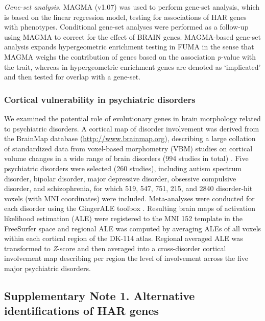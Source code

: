 \begin{refsection}
\noindent
\textit{Gene-set analysis.} MAGMA (v1.07) \citep{de2015magma} was used to perform gene-set analysis, which is based on the linear regression model, testing for associations of HAR genes with phenotypes. Conditional gene-set analyses were performed as a follow-up using MAGMA to correct for the effect of BRAIN genes. MAGMA-based gene-set analysis expands hypergeometric enrichment testing in FUMA \citep{watanabe2017functional} in the sense that MAGMA weighs the contribution of genes based on the association \textit{p}-value with the trait, whereas in hypergeometric enrichment genes are denoted as ‘implicated’ and then tested for overlap with a gene-set. 

\subsubsection*{Cortical vulnerability in psychiatric disorders}
We examined the potential role of evolutionary genes in brain morphology related to psychiatric disorders. A cortical map of disorder involvement was derived from the BrainMap database (\url{http://www.brainmap.org}), describing a large collation of standardized data from voxel-based morphometry (VBM) studies on cortical volume changes in a wide range of brain disorders (994 studies in total) \citep{Fox2002MappingCA,Fox2005BrainMapTO,Vanasse2018BrainMapVA}. Five psychiatric disorders were selected (260 studies), including autism spectrum disorder, bipolar disorder, major depressive disorder, obsessive compulsive disorder, and schizophrenia, for which 519, 547, 751, 215, and 2840 disorder-hit voxels (with MNI coordinates) were included. Meta-analyses were conducted for each disorder using the GingerALE toolbox \citep{Eickhoff2009CoordinatebasedAL,Turkeltaub2012MinimizingWA}. Resulting brain maps of activation likelihood estimation (ALE) were registered to the MNI 152 template in the FreeSurfer space and regional ALE was computed by averaging ALEs of all voxels within each cortical region of the DK-114 atlas. Regional averaged ALE was transformed to \textit{Z}-score and then averaged into a cross-disorder cortical involvement map describing per region the level of involvement across the five major psychiatric disorders.

\subsection*{Supplementary Note 1. Alternative identifications of HAR genes}

\end{refsection}
